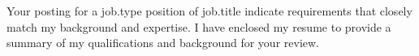 Your posting for a {{job.type}} position of {{job.title}} indicate requirements that closely match my background and expertise. I have enclosed my resume to provide a summary of my qualifications and background for your review.